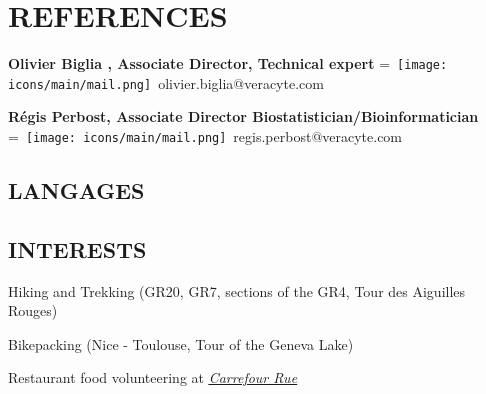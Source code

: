 \documentclass[]{plushcv}
\begin{document}
\begin{minipage}[t]{0.70\textwidth}
\sectionsep
\sectionsep





\section{REFERENCES} 
\textbf{Olivier Biglia , Associate Director, Technical expert}
\begingroup
{}=\hbox{
\texttt{[image: icons/main/mail.png]}\hspace{0.1cm} olivier.biglia@veracyte.com
}
\parbox{\wd0}{}\endgroup

\sectionsep
\textbf{Régis Perbost, Associate Director Biostatistician/Bioinformatician} 
\begingroup
{}=\hbox{
\texttt{[image: icons/main/mail.png]}\hspace{0.1cm} regis.perbost@veracyte.com
}
\parbox{\wd0}{}\endgroup
\sectionsep

\sectionsep

\end{minipage} 
\hfill
\begin{minipage}[t]{0.25\textwidth} 
\sectionsep
\sectionsep
\sectionsep
\sectionsep
\sectionsep
\sectionsep
\sectionsep
\sectionsep

\subsection{LANGAGES}
\sectionsep
\runsubsection{}

\sectionsep
\runsubsection{}
\sectionsep
\sectionsep

\subsection{INTERESTS} 
\sectionsep
\sectionsep
\sectionsep
\begin{tightemize}
\item Hiking and Trekking (GR20, GR7, sections of the GR4, Tour des Aiguilles Rouges)
\item Bikepacking (Nice - Toulouse, Tour of the Geneva Lake) 
\item Restaurant food volunteering at \href{https://carrefour-rue.ch}{\underline{\textit{Carrefour Rue}}}
\end{tightemize}

\end{minipage}
\end{document}
